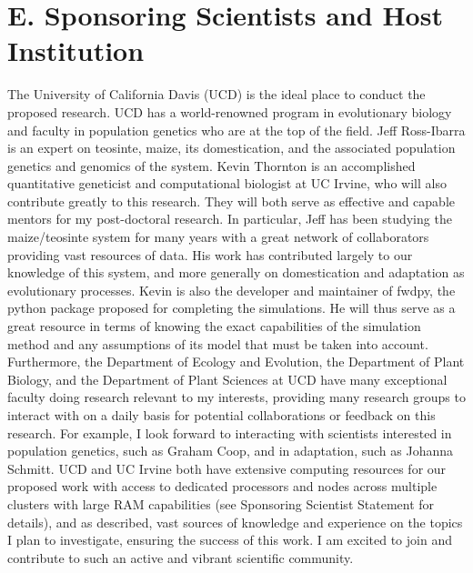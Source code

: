\section*{E. Sponsoring Scientists and Host Institution}

The University of California Davis (UCD) is the ideal place to conduct the proposed research. UCD has a world-renowned program in evolutionary biology and faculty in population genetics who are at the top of the field. Jeff Ross\--Ibarra is an expert on teosinte, maize, its domestication, and the associated population genetics and genomics of the system. Kevin Thornton is an accomplished quantitative geneticist and computational biologist at UC Irvine, who will also contribute greatly to this research. They will both serve as effective and capable mentors for my post-doctoral research. In particular, Jeff has been studying the maize\//teosinte system for many years with a great network of collaborators providing vast resources of data. His work has contributed largely to our knowledge of this system, and more generally on domestication and adaptation as evolutionary processes. Kevin is also the developer and maintainer of fwdpy, the python package proposed for completing the simulations. He will thus serve as a great resource in terms of knowing the exact capabilities of the simulation method and any assumptions of its model that must be taken into account.
Furthermore, the Department of Ecology and Evolution, the Department of Plant Biology, and the Department of Plant Sciences at UCD have many exceptional faculty doing research relevant to my interests, providing many research groups to interact with on a daily basis for potential collaborations or feedback on this research. For example, I look forward to interacting with scientists interested in population genetics, such as Graham Coop, and in adaptation, such as Johanna Schmitt. %
UCD and UC Irvine both have extensive computing resources for our proposed work with access to dedicated processors and nodes across multiple clusters with large RAM capabilities (see Sponsoring Scientist Statement for details), and as described, vast sources of knowledge and experience on the topics I plan to investigate, ensuring the success of this work. I am excited to join and contribute to such an active and vibrant scientific community.

